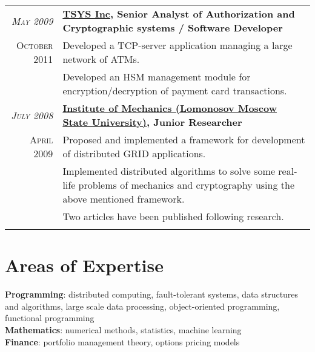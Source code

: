 \documentclass[unicode,a4paper,10pt]{article}
\begin{document}
\begin{tabular}{r p{13cm}}
 \emph{\textsc{May 2009}} & \textbf{\href{http://www.tsys.com}{TSYS Inc}, Senior Analyst of Authorization and Cryptographic systems / Software Developer} \\
\textsc{October 2011}
&\footnotesize{Developed a TCP-server application managing a large network of ATMs.} \\
&\footnotesize{Developed an HSM management module for encryption/decryption of payment card transactions.} \\

 
 \emph{\textsc{July 2008}} & \textbf{\href{http://www.imec.msu.ru/}{Institute of Mechanics (Lomonosov Moscow State University)}, Junior Researcher} \\
\textsc{April 2009}
&\footnotesize{Proposed and implemented a framework for development of distributed GRID applications.}\\
&\footnotesize{Implemented distributed algorithms to solve some real-life problems of mechanics and cryptography using the above mentioned framework.}\\
&\footnotesize{Two articles have been published following research.}\\ 
\multicolumn{2}{c}{} 
\end{tabular}

\section{Areas of Expertise}
\textbf{Programming}: distributed computing, fault-tolerant systems, data structures and algorithms,  large scale data processing, object-oriented programming, functional programming\\
\textbf{Mathematics}: numerical methods, statistics, machine learning\\
\textbf{Finance}: portfolio management theory, options pricing models \\
\end{document}

